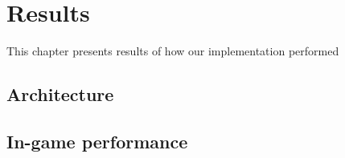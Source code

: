 
\chapter{Results}
This chapter presents results of how our implementation performed
\section{Architecture}
\label{sec:architecture}

\section{In-game performance}

\section{}